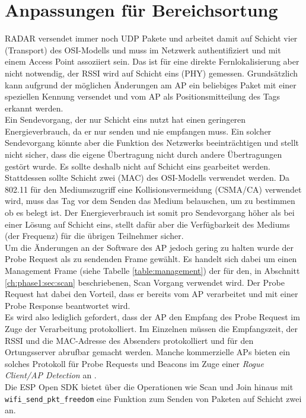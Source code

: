 \section{Anpassungen für Bereichsortung}
\label{ch:phase2:sec:anpassungbereich}
RADAR versendet immer noch UDP Pakete und arbeitet damit auf Schicht vier (Transport) des OSI-Modells und muss im Netzwerk authentifiziert und mit einem Access Point assoziiert sein.
Das ist für eine direkte Fernlokalisierung aber nicht notwendig, der RSSI wird auf Schicht eins (PHY) gemessen.
Grundsätzlich kann aufgrund der möglichen Änderungen am AP ein beliebiges Paket mit einer speziellen Kennung versendet und vom AP als Positionsmitteilung des Tags erkannt werden. \\
Ein Sendevorgang, der nur Schicht eins nutzt hat einen geringeren Energieverbrauch, da er nur senden und nie empfangen muss.
Ein solcher Sendevorgang könnte aber die Funktion des Netzwerks beeinträchtigen und stellt nicht sicher, dass die eigene Übertragung nicht durch andere Übertragungen gestört wurde.
Es sollte deshalb nicht auf Schicht eins gearbeitet werden.\\
Stattdessen sollte Schicht zwei (MAC) des OSI-Modells verwendet werden. 
Da 802.11 für den Mediumszugriff eine Kollisionsvermeidung (CSMA/CA) verwendet wird, muss das Tag vor dem Senden das Medium belauschen, um zu bestimmen ob es belegt ist.
Der Energieverbrauch ist somit pro Sendevorgang höher als bei einer Lösung auf Schicht eins, stellt dafür aber die Verfügbarkeit des Mediums (der Frequenz) für die übrigen Teilnehmer sicher. \\
Um die Änderungen an der Software des AP jedoch gering zu halten wurde der Probe Request als zu sendenden Frame gewählt.
Es handelt sich dabei um einen Management Frame (siehe Tabelle \ref{table:management}) der für den, in Abschnitt \ref{ch:phase1:sec:scan} beschriebenen, Scan Vorgang verwendet wird.
Der Probe Request hat dabei den Vorteil, dass er bereits vom AP verarbeitet und mit einer Probe Response beantwortet wird. \\
Es wird also lediglich gefordert, dass der AP den Empfang des Probe Request im Zuge der Verarbeitung protokolliert. 
Im Einzelnen müssen die Empfangszeit, der RSSI und die MAC-Adresse des Absenders protokolliert und für den Ortungsserver abrufbar gemacht werden. 
Manche kommerzielle APs bieten ein solches Protokoll für Probe Requests und Beacons im Zuge einer \textit{Rogue Client/AP Detection} an \cite{lancom2017rouge}.\\
Die ESP Open SDK bietet über die Operationen wie Scan und Join hinaus mit \texttt{wifi\_send\_pkt\_freedom} eine Funktion zum Senden von Paketen auf Schicht zwei an.
